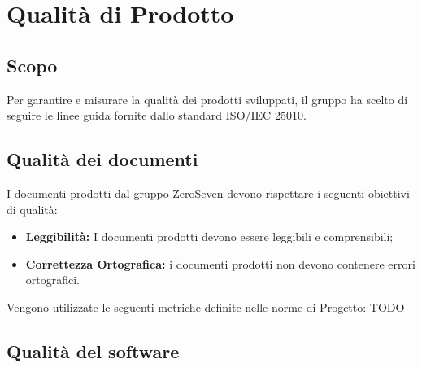 \chapter{Qualità di Prodotto}
\section{Scopo}
Per garantire e misurare la qualità dei prodotti sviluppati, il gruppo ha scelto di seguire le linee guida fornite dallo standard ISO/IEC 25010.\\
\section{Qualità dei documenti}
I documenti prodotti dal gruppo ZeroSeven devono rispettare i seguenti obiettivi di qualità:
\begin{itemize}
    \item \textbf{Leggibilità:} I documenti prodotti devono essere leggibili e comprensibili;
    \item \textbf{Correttezza Ortografica:} i documenti prodotti non devono contenere errori ortografici.
\end{itemize}
Vengono utilizzate le seguenti metriche definite nelle norme di Progetto:
TODO

\section{Qualità del software}
